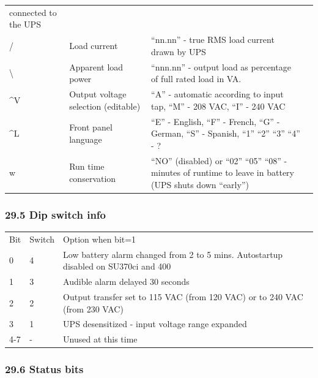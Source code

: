 \begin{longtable}{llll}
{connected to the UPS} & { 
 } \\
{/} & {Load current} & {``nn.nn'' - true RMS load current drawn by UPS} & { 
 } \\
{\textbackslash{}} & {Apparent load power} & {``nnn.nn'' - output load as
percentage of full rated load in VA.} & { 
 } \\
{\^{}V} & {Output voltage selection (editable)} & {``A'' - automatic according
to input tap, ``M'' - 208 VAC, ``I'' - 240 VAC} & { 
 } \\
{\^{}L} & {Front panel language} & {``E'' - English, ``F'' - French, ``G'' -
German, ``S'' - Spanish, ``1'' ``2'' ``3'' ``4'' - ?} & { 
 } \\
{w} & {Run time conservation} & {``NO'' (disabled) or ``02'' ``05'' ``08'' -
minutes of runtime to leave in battery (UPS shuts down ``early'')} & {  
}

\end{longtable}

\label{Dip-switch-info}

\subsubsection*{29.5 Dip switch info}

\begin{longtable}{lll}
{Bit} & {Switch} & {Option when bit=1 
 } \\
{0} & {4} & {Low battery alarm changed from 2 to 5 mins. Autostartup disabled
on SU370ci and 400 
 } \\
{1} & {3} & {Audible alarm delayed 30 seconds 
 } \\
{2} & {2} & {Output transfer set to 115 VAC (from 120 VAC) or to 240 VAC (from
230 VAC) 
 } \\
{3} & {1} & {UPS desensitized - input voltage range expanded 
 } \\
{4-7} & {-} & {Unused at this time 
}

\end{longtable}

\label{Status-bits}

\subsubsection*{29.6 Status bits}

